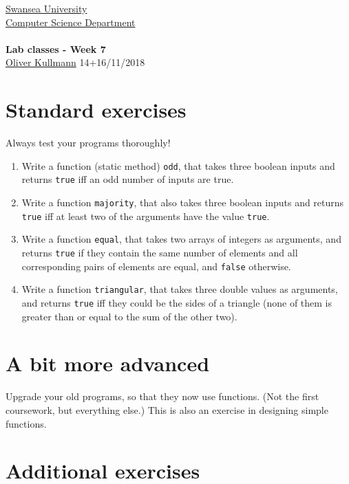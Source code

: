 \documentclass[11pt]{article}
\newcommand{\Java}{\lstset{language=Java,keywordstyle=\bfseries,breaklines,breakindent=30pt}}
\begin{document}
\begin{center}
  \href{http://www.swan.ac.uk/}{Swansea University}\\
  \href{http://www.swan.ac.uk/compsci/}{Computer Science Department}\\[1ex]
  \href{\chp}{\module}\\[1ex]
  \textbf{Lab classes - Week 7}\\
  \href{http://cs.swan.ac.uk/~csoliver}{Oliver Kullmann} 14+16/11/2018
\end{center}


\section{Standard exercises}
\label{sec:stdex}

\Java

Always test your programs thoroughly!

\begin{enumerate}
\item Write a function (static method) \texttt{odd}, that takes three boolean inputs and returns \texttt{true} iff an odd number of inputs are true.
\item Write a function \texttt{majority}, that also takes three boolean inputs and returns \texttt{true} iff at least two of the arguments have the value \texttt{true}.
\item Write a function \texttt{equal}, that takes two arrays of integers as arguments, and returns \texttt{true} if they contain the same number of elements and all corresponding pairs of elements are equal, and \texttt{false} otherwise.
\item Write a function \texttt{triangular}, that takes three double values as arguments, and returns \texttt{true} iff they could be the sides of a triangle (none of them is greater than or equal to the sum of the other two). 
\end{enumerate}


\section{A bit more advanced}
\label{sec:advanced}

Upgrade your old programs, so that they now use functions. (Not the first coursework, but everything else.) This is also an exercise in designing simple functions.


\section{Additional exercises}
\label{sec:addex}
\end{document}
